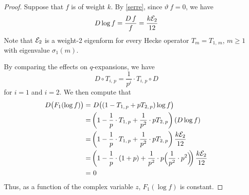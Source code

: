 \documentclass{gtpart}
\theoremstyle{definition}
\theoremstyle{remark}
\newcommand{\CE}{{\cal E}}
\newcommand{\si}{\sigma}
\renewcommand{\=}{\approx}
\renewcommand{\-}{\sim}
\numberwithin{equation}{section}
\begin{document}
\begin{proof}
 Suppose that $f$ is of weight $k$.  By \eqref{serre}, since 
 $\vartheta ~\! f = 0$, we have 
 \[
  D \log f = \frac{D ~\! f}{f} = \frac{k \CE_2}{12} 
 \]
 Note that $\CE_2$ is a weight-2 eigenform for every Hecke operator 
 $T_m = T_{1,\,m}$, $m \geq 1$ with eigenvalue $\si_1(m)$.  

 By comparing the effects on $q$-expansions, we have 
 \begin{equation}
  \label{DT}
  D \circ T_{i,\,p} = \frac{1}{p^i} \cdot T_{i,\,p} \circ D 
 \end{equation}
 for $i = 1$ and $i = 2$.  We then compute that 
 \begin{equation*}
  \begin{split}
   D \big( F_1(\log f) \big) = & ~ D \big( (1 - T_{1,\,p} + p T_{2,\,p}) 
                                 \log f \big) \\
                             = & \left( 1 - \frac{1}{p} \cdot T_{1,\,p} + 
                                 \frac{1}{p^2} \cdot p T_{2,\,p} \right) 
                                 (D \log f) \\
                             = & \left( 1 - \frac{1}{p} \cdot T_{1,\,p} + 
                                 \frac{1}{p^2} \cdot p T_{2,\,p} \right) 
                                 \frac{k \CE_2}{12} \\
                             = & \left( 1 - \frac{1}{p} \cdot (1 + p) + 
                                 \frac{1}{p^2} \cdot p \Big( \frac{1}{p^2} \cdot 
                                 p^2 \Big) \!\! \right) \frac{k \CE_2}{12} \\
                             = & ~ 0 
  \end{split}
 \end{equation*}
 Thus, as a function of the complex variable $z$, $F_1(\log f)$ is constant.  
\end{proof}
\end{document}
